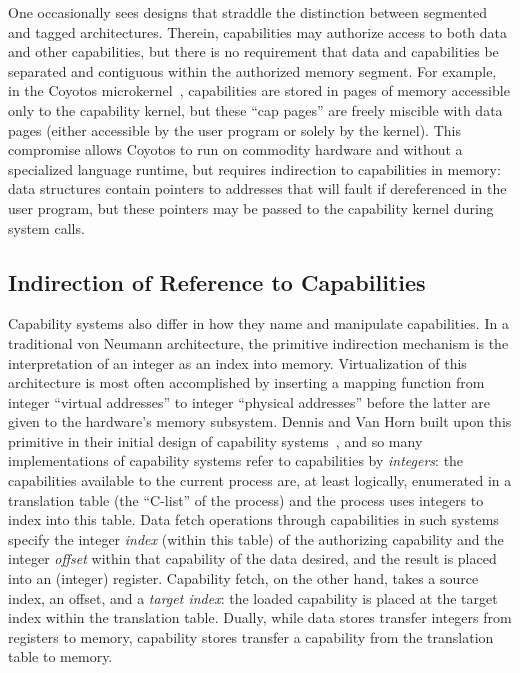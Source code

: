 One occasionally sees designs that straddle the distinction between segmented
and tagged architectures.  Therein, capabilities may authorize access to both
data and other capabilities, but there is no requirement that data and
capabilities be separated and contiguous within the authorized memory segment.
For example, in the Coyotos microkernel~\cite{shapiro:2004}, capabilities are
stored in pages of memory accessible only to the capability kernel, but these
``cap pages'' are freely miscible with data pages (either accessible by the
user program or solely by the kernel).  This compromise allows Coyotos to run
on commodity hardware and without a specialized language runtime, but requires
indirection to capabilities in memory: data structures contain pointers to
addresses that will fault if dereferenced in the user program, but these
pointers may be passed to the capability kernel during system calls.

\subsection{Indirection of Reference to Capabilities} %

Capability systems also differ in how they name and manipulate capabilities.
In a traditional von Neumann architecture, the primitive indirection mechanism
is the interpretation of an integer as an index into memory.  Virtualization of
this architecture is most often accomplished by inserting a mapping function
from integer ``virtual addresses'' to integer ``physical addresses'' before the
latter are given to the hardware's memory subsystem.  Dennis and Van Horn built
upon this primitive in their initial design of capability
systems~\cite{dennis:semantics}, and so many implementations of capability
systems refer to capabilities by \emph{integers}: the capabilities available to
the current process are, at least logically, enumerated in a translation table
(the ``C-list'' of the process) and the process uses integers to index into
this table.  Data fetch operations through capabilities in such systems specify
the integer \emph{index} (within this table) of the authorizing capability and
the integer \emph{offset} within that capability of the data desired, and the
result is placed into an (integer) register.  Capability fetch, on the other
hand, takes a source index, an offset, and a \emph{target index}: the loaded
capability is placed at the target index within the translation table.  Dually,
while data stores transfer integers from registers to memory, capability stores
transfer a capability from the translation table to memory.

